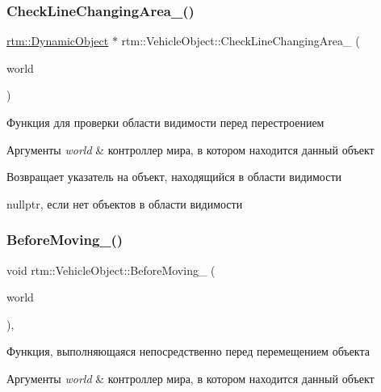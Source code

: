 \subsubsection{\texorpdfstring{Check\+Line\+Changing\+Area\+\_\+()}{CheckLineChangingArea\_()}}
{\footnotesize\ttfamily \hyperlink{classrtm_1_1_dynamic_object}{rtm\+::\+Dynamic\+Object} $\ast$ rtm\+::\+Vehicle\+Object\+::\+Check\+Line\+Changing\+Area\+\_\+ (\begin{DoxyParamCaption}\item[{\hyperlink{classrtm_1_1_world_controller}{World\+Controller} $\ast$const}]{world }\end{DoxyParamCaption})\hspace{0.3cm}{\ttfamily [protected]}}

Функция для проверки области видимости перед перестроением 
\begin{DoxyParams}{Аргументы}
{\em world} & контроллер мира, в котором находится данный объект \\
\hline
\end{DoxyParams}
\begin{DoxyReturn}{Возвращает}
указатель на объект, находящийся в области видимости 

nullptr, если нет объектов в области видимости 
\end{DoxyReturn}
\mbox{\label{classrtm_1_1_vehicle_object_abac2e84c7d102e9170843efd80c53fd2}} 
\subsubsection{\texorpdfstring{Before\+Moving\+\_\+()}{BeforeMoving\_()}}
{\footnotesize\ttfamily void rtm\+::\+Vehicle\+Object\+::\+Before\+Moving\+\_\+ (\begin{DoxyParamCaption}\item[{\hyperlink{classrtm_1_1_world_controller}{World\+Controller} $\ast$const}]{world }\end{DoxyParamCaption})\hspace{0.3cm}{\ttfamily [protected]}, {\ttfamily [virtual]}}

Функция, выполняющаяся непосредственно перед перемещением объекта 
\begin{DoxyParams}{Аргументы}
{\em world} & контроллер мира, в котором находится данный объект \\
\hline
\end{DoxyParams}
\mbox{\label{classrtm_1_1_vehicle_object_a4ffe184361efac31e9a009cfc4e07a1b}} 
